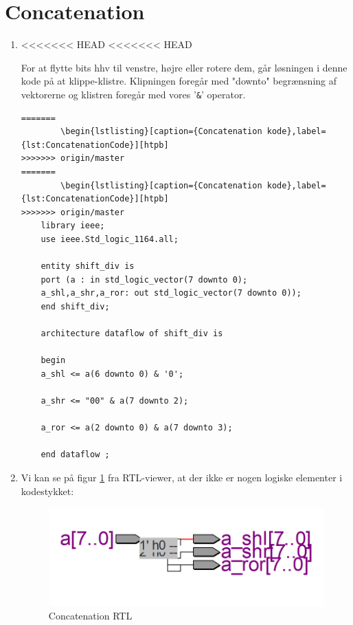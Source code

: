 \newpage
\section{Concatenation}
\begin{enumerate}
	\item[1)]
<<<<<<< HEAD
<<<<<<< HEAD

	For at flytte bits hhv til venstre, højre eller rotere dem, går løsningen i denne kode på at klippe-klistre. Klipningen foregår med "downto" begrænsning af vektorerne og klistren foregår med vores '\verb|&|' operator.
		\begin{lstlisting}[caption={Concatenation kode},label={lst:ConcatenationCode}]
=======
		\begin{lstlisting}[caption={Concatenation kode},label={lst:ConcatenationCode}][htpb]
>>>>>>> origin/master
=======
		\begin{lstlisting}[caption={Concatenation kode},label={lst:ConcatenationCode}][htpb]
>>>>>>> origin/master
	library ieee;
	use ieee.Std_logic_1164.all;
	
	entity shift_div is
	port (a : in std_logic_vector(7 downto 0);
	a_shl,a_shr,a_ror: out std_logic_vector(7 downto 0));
	end shift_div; 
	
	architecture dataflow of shift_div is
	
	begin 
	a_shl <= a(6 downto 0) & '0';
	
	a_shr <= "00" & a(7 downto 2);
	
	a_ror <= a(2 downto 0) & a(7 downto 3);
	
	end dataflow ;

		\end{lstlisting}
	\item[2)]
Vi kan se på figur \ref{fig:concatenationRTL} fra RTL-viewer, at der ikke er nogen logiske elementer i kodestykket:
	\begin{figure}[H]
		\centering
		\includegraphics[scale=0.5]{pictures/Oevelse3/Concatenation_RTL.png}
		\caption{Concatenation RTL}
		\label{fig:concatenationRTL}
	\end{figure}


\end{enumerate}
